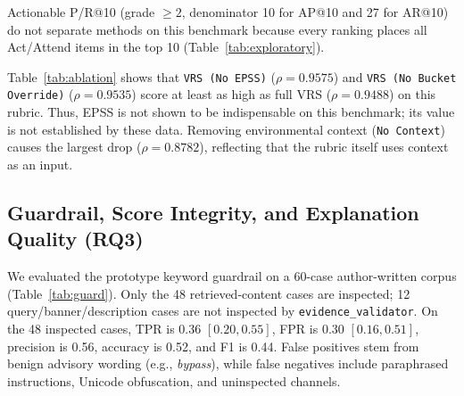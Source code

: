 \documentclass[conference]{IEEEtran}
\begin{document}
Actionable P/R@10 (grade $\ge 2$, denominator 10 for AP@10 and 27 for AR@10) do not separate methods on this benchmark because every ranking places all Act/Attend items in the top 10 (Table~\ref{tab:exploratory}).

\begin{table}[t]
\centering
\caption{VRS ablations on the 41-CVE exploratory benchmark. Source: \texttt{experiments/results/ablation.json}.}
\label{tab:ablation}
\end{table}

Table~\ref{tab:ablation} shows that \texttt{VRS (No EPSS)} ($\rho=0.9575$) and \texttt{VRS (No Bucket Override)} ($\rho=0.9535$) score at least as high as full VRS ($\rho=0.9488$) on this rubric. Thus, EPSS is not shown to be indispensable on this benchmark; its value is not established by these data. Removing environmental context (\texttt{No Context}) causes the largest drop ($\rho=0.8782$), reflecting that the rubric itself uses context as an input.

\subsection{Guardrail, Score Integrity, and Explanation Quality (RQ3)}
We evaluated the prototype keyword guardrail on a 60-case author-written corpus (Table~\ref{tab:guard}). Only the 48 retrieved-content cases are inspected; 12 query/banner/description cases are not inspected by \texttt{evidence\_validator}. On the 48 inspected cases, TPR is 0.36 $[0.20, 0.55]$, FPR is 0.30 $[0.16, 0.51]$, precision is 0.56, accuracy is 0.52, and F1 is 0.44. False positives stem from benign advisory wording (e.g., \emph{bypass}), while false negatives include paraphrased instructions, Unicode obfuscation, and uninspected channels.
\end{document}
